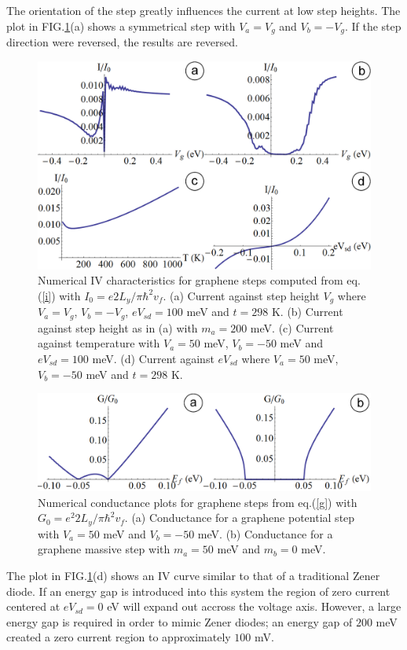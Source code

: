 \documentclass[prl,twocolumn,aps,superscriptaddress,floatfix,10pt]{revtex4}
\begin{document}
	The orientation of the step greatly influences the current at low step heights. The plot in FIG.\ref{step-i-flat}(a) shows a symmetrical step with $V_{a}=V_{g}$ and $V_{b}=-V_{g}$. If the step direction were reversed, the results are reversed.
\begin{figure}
	\includegraphics[scale=0.2]{step-i-flat}
	\caption{Numerical IV characteristics for graphene steps computed from eq.(\ref{i}) with $I_{0}=e2L_{y}/\pi\hbar^{2}v_{f}$. (a) Current against step height $V_{g}$ where $V_{a}=V_{g}$, $V_{b}=-V_{g}$, $eV_{sd}=100$ meV and $t=298$ K. (b) Current against step height as in (a) with $m_{a}=200$ meV. (c) Current against temperature with $V_{a}=50$ meV, $V_{b}=-50$ meV and $eV_{sd}=100$ meV. (d) Current against $eV_{sd}$ where $V_{a}=50$ meV, $V_{b}=-50$ meV and $t=298$ K.}
	\label{step-i-flat}
\end{figure}
\begin{figure}
	\includegraphics[scale=0.2]{step-g-flat}
	\caption{Numerical conductance plots for graphene steps from eq.(\ref{g}) with $G_{0}=e^{2}2L_{y}/\pi\hbar^{2}v_{f}$. (a) Conductance for a graphene potential step with $V_{a}=50$ meV and $V_{b}=-50$ meV. (b) Conductance for a graphene massive step with $m_{a}=50$ meV and $m_{b}=0$ meV.}
	\label{step-g-flat}
\end{figure}

	The plot in FIG.\ref{step-i-flat}(d) shows an IV curve similar to that of a traditional Zener diode. If an energy gap is introduced into this system the region of zero current centered at $eV_{sd}=0$ eV will expand out accross the voltage axis. However, a large energy gap is required in order to mimic Zener diodes; an energy gap of $200$ meV created a zero current region to approximately $100$ mV.
\end{document}
